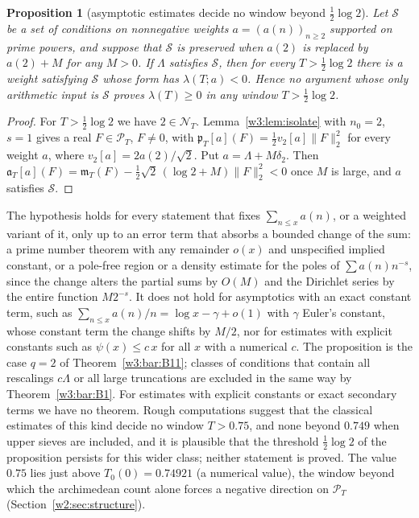 \documentclass[11pt]{amsart}
\newtheorem{proposition}[theorem]{Proposition}
\theoremstyle{definition}
\theoremstyle{remark}
\numberwithin{equation}{section}
\newcommand{\PT}{\mathcal{P}_T}                        %
\newcommand{\NT}{\mathcal{N}_T}                        %
\newcommand{\mT}{\mathfrak{m}_T}                       %
\newcommand{\pT}{\mathfrak{p}_T}                       %
\newcommand{\aT}{\mathfrak{a}_T}                       %
\newcommand{\lam}{\lambda(T)}                          %
\begin{document}
\begin{proposition}[asymptotic estimates decide no window beyond $\frac12\log2$]\label{w7:prop:finmod}
Let $\mathcal S$ be a set of conditions on nonnegative weights $a=(a(n))_{n\ge2}$ supported on prime powers, and
suppose that $\mathcal S$ is preserved when $a(2)$ is replaced by $a(2)+M$ for any $M>0$. If $\Lambda$ satisfies
$\mathcal S$, then for every $T>\frac12\log2$ there is a weight satisfying $\mathcal S$ whose form has
$\lambda(T;a)<0$. Hence no argument whose only arithmetic input is $\mathcal S$ proves $\lam\ge0$ in any window
$T>\frac12\log2$.
\end{proposition}

\begin{proof}
For $T>\frac12\log2$ we have $2\in\NT$. Lemma~\ref{w3:lem:isolate} with $n_0=2$, $s=1$ gives a real
$F\in\PT$, $F\neq0$, with $\pT[a](F)=\frac12 v_2[a]\|F\|_2^2$ for every weight $a$, where
$v_2[a]=2a(2)/\sqrt2$. Put $a=\Lambda+M\delta_2$. Then
$\aT[a](F)=\mT(F)-\frac12\sqrt2\,(\log2+M)\|F\|_2^2<0$ once $M$ is large, and $a$ satisfies $\mathcal S$.
\end{proof}

The hypothesis holds for every statement that fixes $\sum_{n\le x}a(n)$, or a weighted variant of it, only up
to an error term that absorbs a bounded change of the sum: a prime number theorem with any remainder $o(x)$
and unspecified implied constant, or a pole-free region or a density estimate for the poles of
$\sum a(n)n^{-s}$, since the change alters the partial sums by $O(M)$ and the Dirichlet series by the entire
function $M2^{-s}$. It does not hold for asymptotics with an exact constant term, such as
$\sum_{n\le x}a(n)/n=\log x-\gamma+o(1)$ with $\gamma$ Euler's constant, whose constant term the change shifts
by $M/2$, nor for estimates with explicit constants such as $\psi(x)\le c\,x$ for all $x$ with a numerical $c$.
The proposition is the case $q=2$ of Theorem~\ref{w3:bar:B11}; classes of conditions that contain all
rescalings $c\Lambda$ or all large truncations are excluded in the same way by Theorem~\ref{w3:bar:B1}. For
estimates with explicit constants or exact secondary terms we have no theorem. Rough computations suggest that
the classical estimates of this kind decide no window $T>0.75$, and none beyond $0.749$ when upper sieves are
included, and it is plausible that the threshold $\frac12\log2$ of the proposition persists for this wider
class; neither statement is proved. The value $0.75$ lies just above $T_0(0)=0.74921$ (a numerical value), the
window beyond which the archimedean count alone forces a negative direction on $\PT$
(Section~\ref{w2:sec:structure}).
\end{document}
